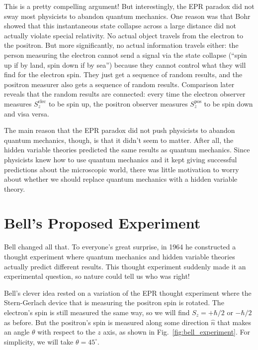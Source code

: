 This is a pretty compelling argument!  But interestingly, the EPR
paradox did not sway most physicists to abandon quantum mechanics.
One reason was that Bohr showed that this instantaneous state collapse
across a large distance did not actually violate special relativity.
No actual object travels from the electron to the positron.  But more
significantly, no actual information travels either: the person
measuring the electron cannot send a signal via the state collapse
(``spin up if by land, spin down if by sea'') because they cannot
control what they will find for the electron spin.  They just get a
sequence of random results, and the positron measurer also gets a
sequence of random results.  Comparison later reveals that the random
results are connected:  every time the electron observer measures $S_z^\text{elec}$ to be spin up, the positron observer measures $S_z^\text{pos}$ to be spin down and visa versa.

The main reason that the EPR paradox did not push physicists to
abandon quantum mechanics, though, is that it didn't seem to matter.
After all, the hidden variable theories predicted the same results as
quantum mechanics.  Since physicists knew how to use quantum mechanics
and it kept giving successful predictions about the microscopic world,
there was little motivation to worry about whether we should replace
quantum mechanics with a hidden variable theory.

\section{Bell's Proposed Experiment}

\label{section:bell}

Bell changed all that.  To everyone's great surprise, in 1964 he
constructed a thought experiment where quantum mechanics and hidden
variable theories actually predict different results.  This thought
experiment suddenly made it an experimental question, so nature could
tell us who was right!

Bell's clever idea rested on a variation of the EPR thought experiment
where the Stern-Gerlach device that is measuring the positron spin is
rotated.  The electron's spin is still measured the same way, so we
will find $S_z = +\hbar/2$ or $-\hbar/2$ as before.  But the
positron's spin is measured along some direction $\hat n$ that makes
an angle $\theta$ with respect to the $z$ axis, as shown in
Fig.~\ref{fig:bell_experiment}.  For simplicity, we will take
$\theta = 45^\circ$.


